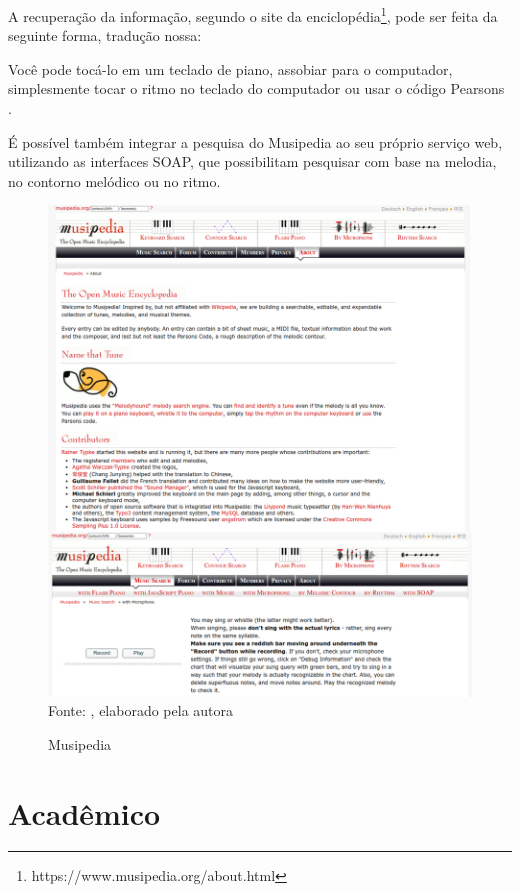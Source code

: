 A recuperação da informação, segundo o site da enciclopédia\footnote{https://www.musipedia.org/about.html}, pode ser feita da seguinte forma, tradução nossa:

\begin{citacao}
[...]Você pode tocá-lo em um teclado de piano, assobiar para o computador, simplesmente tocar o ritmo no teclado do computador ou usar o código Pearsons \cite{musipedia}.
\end{citacao}

É possível também integrar a pesquisa do Musipedia ao seu próprio serviço web, utilizando as interfaces SOAP, que possibilitam pesquisar com base na melodia, no contorno melódico ou no ritmo.

\begin{figure}[!htb]
   \centering
   \caption{Musipedia}\label{fig:musipedia} 
   \includegraphics[scale=0.40]{figuras/musipedia.png}
   \\Fonte: \cite{musipedia}, elaborado pela autora
\end{figure}



\section{Acadêmico} \label{sec:academico}

